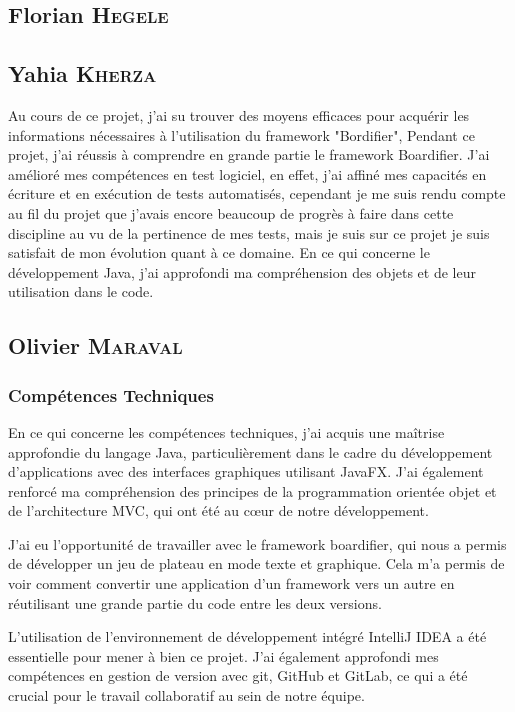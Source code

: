 \subsection*{Florian \textsc{Hegele}}

\subsection*{Yahia \textsc{Kherza}}

Au cours de ce projet, j’ai su trouver des moyens efficaces pour acquérir les informations nécessaires à l’utilisation du framework "Bordifier", 
Pendant ce projet, j'ai réussis à comprendre en grande partie le framework Boardifier.
J’ai amélioré mes compétences en test logiciel, en effet, j'ai affiné mes capacités en écriture et en exécution de tests automatisés, cependant je me suis rendu compte au fil du projet que j'avais encore beaucoup de progrès à faire dans cette discipline au vu de la pertinence de mes tests, mais je suis sur ce projet je suis satisfait de mon évolution quant à ce domaine.
En ce qui concerne le développement Java, j’ai approfondi ma compréhension des objets et de leur utilisation dans le code.

\subsection*{Olivier \textsc{Maraval}}

\subsubsection*{Compétences Techniques}

En ce qui concerne les compétences techniques, j'ai acquis une maîtrise approfondie du langage Java, particulièrement dans le cadre du développement d'applications avec des interfaces graphiques utilisant JavaFX. J'ai également renforcé ma compréhension des principes de la programmation orientée objet et de l'architecture MVC, qui ont été au cœur de notre développement.

J'ai eu l'opportunité de travailler avec le framework boardifier, qui nous a permis de développer un jeu de plateau en mode texte et graphique. Cela m'a permis de voir comment convertir une application d'un framework vers un autre en réutilisant une grande partie du code entre les deux versions.

L'utilisation de l'environnement de développement intégré IntelliJ IDEA a été essentielle pour mener à bien ce projet. J'ai également approfondi mes compétences en gestion de version avec git, GitHub et GitLab, ce qui a été crucial pour le travail collaboratif au sein de notre équipe.

